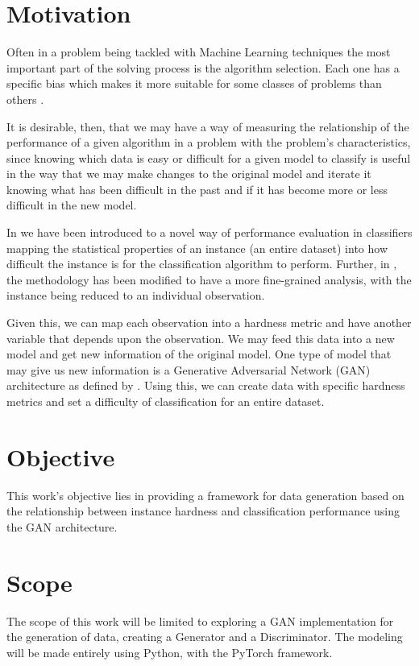 \section{Motivation}
Often in a problem being tackled with Machine Learning techniques the most important part of the solving process is the algorithm selection. Each one has a specific bias which makes it more suitable for some classes of problems than others \cite{Lorena2022}. 

It is desirable, then, that we may have a way of measuring the relationship of the performance of a given algorithm in a problem with the problem's characteristics, since knowing which data is easy or difficult for a given model to classify is useful in the way that we may make changes to the original model and iterate it knowing what has been difficult in the past and if it has become more or less difficult in the new model.

In \cite{Munoz2018} we have been introduced to a novel way of performance evaluation in classifiers mapping the statistical properties of an instance (an entire dataset) into how difficult the instance is for the classification algorithm to perform. Further, in \cite{Lorena2022}, the methodology has been modified to have a more fine-grained analysis, with the instance being reduced to an individual observation.

Given this, we can map each observation into a hardness metric and have another variable that depends upon the observation. We may feed this data into a new model and get new information of the original model. One type of model that may give us new information is a Generative Adversarial Network (GAN) architecture as defined by \cite{Goodfellow2014}. Using this, we can create data with specific hardness metrics and set a difficulty of classification for an entire dataset.

\section{Objective}

This work's objective lies in providing a framework for data generation based on the relationship between instance hardness and classification performance using the GAN architecture. 

\section{Scope}

The scope of this work will be limited to exploring a GAN implementation for the generation of data, creating a Generator and a Discriminator.  The modeling will be made entirely using Python, with the PyTorch \cite{paszke2019pytorch} framework.

